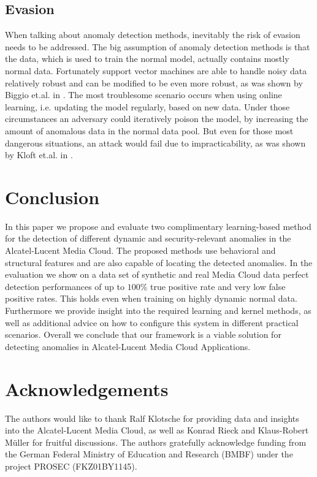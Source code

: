 \documentclass{llncs}
\begin{document}
 \subsection{Evasion}
\label{evasion}
When talking about anomaly detection methods, inevitably the risk of evasion needs to be addressed. The big assumption of anomaly detection methods is that the data, which is used to train the normal model, actually contains mostly normal data. Fortunately support vector machines are able to handle noisy data relatively robust and can be modified to be even more robust, as was shown by Biggio et.al. in \cite{BigNelLas11}. The most troublesome scenario occurs when using online learning, i.e. updating the model regularly, based on new data. Under those circumstances an adversary could iteratively poison the model, by increasing the amount of anomalous data in the normal data pool. But even for those most dangerous situations, an attack would fail due to impracticability, as was shown by Kloft et.al. in \cite{KloLas12}.
  
\section{Conclusion}
\label{sec:conclusion}

In this paper we propose and evaluate two complimentary learning-based method for the detection of different dynamic and security-relevant anomalies in the Alcatel-Lucent Media Cloud. The proposed methods use behavioral and structural features and are also capable of locating the detected anomalies. In the evaluation we show on a data set of synthetic and real Media Cloud data perfect detection performances of up to $100\%$ true positive rate and very low false positive rates. This holds even when training on highly dynamic normal data. Furthermore we provide insight into the required learning and kernel methods, as well as additional advice on how to configure this system in different practical scenarios. Overall we conclude that our framework is a viable solution for detecting anomalies in Alcatel-Lucent Media Cloud Applications.

 \section{Acknowledgements}
\label{acknowledgements}
The authors would like to thank Ralf Klotsche for providing data and insights into the Alcatel-Lucent Media Cloud, as well as Konrad Rieck and Klaus-Robert M\"uller for fruitful discussions. The authors gratefully acknowledge funding from the German Federal Ministry of Education and Research (BMBF) under the project PROSEC (FKZ01BY1145).
 



\end{document}
